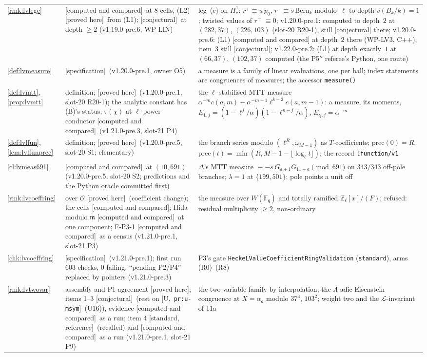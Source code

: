 \documentclass[11pt]{article}
\theoremstyle{remark}
\newcommand{\F}{\mathbb{F}}
\newcommand{\Z}{\mathbb{Z}}
\newcommand{\m}{\mathfrak{m}}
\newcommand{\PROVED}{\textsf{[proved here]}}
\newcommand{\STD}{\textsf{[standard, reference]}}
\newcommand{\CONJ}{\textsf{[conjectural]}}
\newcommand{\CMPD}{\textsf{[computed and compared]}}   %
\newcommand{\SPEC}{\textsf{[specification]}}           %
\newcommand{\Ucite}[1]{[U,~\texttt{#1}]}               %
\begin{document}
\begin{center}
\begin{longtable}{@{}l>{\raggedright\arraybackslash}p{3.6cm}>{\raggedright\arraybackslash}p{10.6cm}@{}}
\ref{rmk:lvlegc} & \CMPD\ at $8$ cells, (L2) \PROVED\ from (L1); \CONJ\ at depth $\ge2$ (v1.19.0-pre.6, WP-LIN) & leg~(c) on $H^{1}_c$: $r^{+}\equiv u\,p_0$, $r^{-}\equiv s\,\mathrm{Bern}_k$ modulo~$\ell$ to depth $v(B_k/k)=1$; twisted values of $r^{+}$ $\equiv0$; v1.20.0-pre.1: computed to depth~$2$ at $(282,37)$, $(226,103)$ (slot-20 R20-1), still \CONJ{} there; v1.20.0-pre.6: (L1) \CMPD{} at depth~$2$ there (WP-LV3, C++), item~3 still \CONJ; v1.22.0-pre.2: (L1) at depth exactly~$1$ at $(66,37)$, $(102,37)$ computed (the P5$''$ referee's Python, one route) \\
\ref{def:lvmeasure} & \SPEC\ (v1.20.0-pre.1, owner O5) & a measure is a family of \textsf{linear} evaluations, one per ball; index statements are congruences of measures; the accessor \texttt{measure()} \\
\ref{def:lvmtt}, \ref{prop:lvmtt} & definition; \PROVED\ (v1.20.0-pre.1, slot-20 R20-1); the analytic constant has (B)'s status; $\tau(\chi)$ at $\ell$-power conductor \CMPD\ (v1.21.0-pre.3, slot-21 P4) & the $\ell$-stabilised MTT measure $\alpha^{-m}c(a,m)-\alpha^{-m-1}\ell^{k-2}c(a,m-1)$: a measure, its moments, $E_{\mathbf1,j}=(1-\ell^{j}/\alpha)(1-\ell^{n-j}/\alpha)$, $E_{\chi,j}=\alpha^{-m}$ \\
\ref{def:lvlfun}, \ref{lem:lvlfunprec} & definition; \PROVED\ (v1.20.0-pre.5, slot-20 S1; elementary) & the branch series modulo $(\ell^{R},\omega_{M-1})$ as $T$-coefficients; $\mathrm{prec}(0)=R$, $\mathrm{prec}(t)=\min(R,M-1-\lfloor\log_\ell t\rfloor)$; the record \texttt{lfunction/v1} \\
\ref{cl:lvmeas691} & \CMPD\ at $(10,691)$ (v1.20.0-pre.5, slot-20 S2; predictions and the Python oracle committed first) & $\Delta$'s MTT measure $\equiv-s\,G_{a+1}G_{11-a}\pmod{691}$ on $343/343$ off-pole branches; $\lambda=1$ at $\{199,501\}$; pole points a unit off \\
\ref{rmk:lvcoeffring} & over $\mathcal O$ \PROVED\ (coefficient change); the cells \CMPD; Hida modulo $\m$ \CMPD\ at one component; F-P3-1 \CMPD\ as a census (v1.21.0-pre.1, slot-21 P3) & the measure over $W(\F_q)$ and totally ramified $\Z_\ell[x]/(F)$; refused: residual multiplicity $\ge2$, non-ordinary \\
\ref{chk:lvcoeffring} & \SPEC\ (v1.21.0-pre.1); first run $603$ checks, $0$ failing; ``pending P2/P4'' replaced by pointers (v1.21.0-pre.3) & P3's gate \texttt{HeckeLValueCoefficientRingValidation} (\texttt{standard}), arms (R0)--(R8) \\
\ref{rmk:lvtwovar} & assembly and P1 agreement \PROVED; items 1--3 \CONJ\ (rest on \Ucite{pr:u-msym}~(U16)), evidence \CMPD\ as a run; item 4 \STD\ (recalled) and \CMPD\ as a run (v1.21.0-pre.1, slot-21 P9) & the two-variable family by interpolation; the $\Lambda$-adic Eisenstein congruence at $X=\alpha_a$ modulo $37^{3}$, $103^{2}$; weight two and the $\mathcal L$-invariant of 11a \\

\end{longtable}
\end{center}
\end{document}
